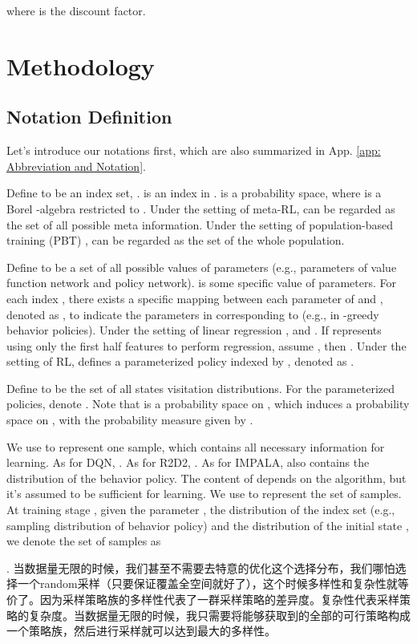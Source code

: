 \documentclass[nohyperref]{article}
\theoremstyle{plain}
\begin{document}
where  is the discount factor.


\section{Methodology}
\label{Sec: Methodology}
\subsection{Notation Definition}

Let's introduce our notations first, which are also summarized in App. \ref{app: Abbreviation and Notation}.

Define  to be an index set, .
 is an index in .
 is a probability space, where  is a Borel -algebra restricted to .
Under the setting of meta-RL,  can be regarded as the set of all possible meta information.
Under the setting of population-based training (PBT) \citep{PBT},  can be regarded as the set of the whole population.

Define  to be a set of all possible values of parameters (e.g., parameters of value function network and policy network).
 is some specific value of parameters.
For each index , there exists a specific mapping between each parameter of  and , denoted as , to indicate the parameters in  corresponding to  (e.g.,  in -greedy behavior policies).
Under the setting of linear regression ,  and .
If  represents using only the first half features to perform regression, assume , then .  
Under the setting of RL,  defines a parameterized policy indexed by , denoted as .

Define  to be the set of all states visitation distributions.
For the parameterized policies, denote 
.
Note that  is a probability space on , 
which induces a probability space on ,
with the probability measure given by 
.

We use  to represent one sample, which contains all necessary information for learning. 
As for DQN, .
As for R2D2, .
As for IMPALA,  also contains the distribution of the behavior policy.
The content of  depends on the algorithm, but it's assumed to be sufficient for learning.
We use  to represent the set of samples.
At training stage , 
given the parameter , 
the distribution of the index set  (e.g., sampling distribution of behavior policy)
and the distribution of the initial state , 
we denote the set of samples as



. 当数据量无限的时候，我们甚至不需要去特意的优化这个选择分布，我们哪怕选择一个random采样（只要保证覆盖全空间就好了），这个时候多样性和复杂性就等价了。因为采样策略族的多样性代表了一群采样策略的差异度。复杂性代表采样策略的复杂度。当数据量无限的时候，我只需要将能够获取到的全部的可行策略构成一个策略族，然后进行采样就可以达到最大的多样性。
\end{document}
